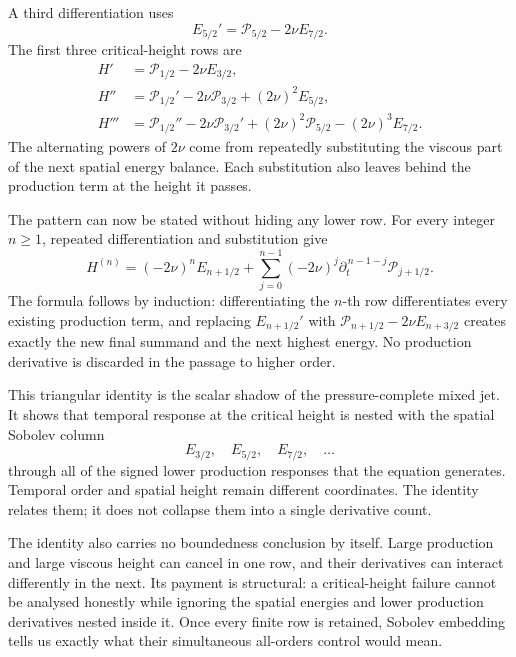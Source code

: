 A third differentiation uses
\[
  E_{5/2}'
  =
  \mathcal P_{5/2}-2\nu E_{7/2}.
\]
The first three critical-height rows are
\begin{align*}
  H'
  &={}
  \mathcal P_{1/2}-2\nu E_{3/2},
  \\
  H''
  &={}
  \mathcal P_{1/2}'
  -2\nu\mathcal P_{3/2}
  +(2\nu)^2E_{5/2},
  \\
  H'''
  &={}
  \mathcal P_{1/2}''
  -2\nu\mathcal P_{3/2}'
  +(2\nu)^2\mathcal P_{5/2}
  -(2\nu)^3E_{7/2}.
\end{align*}
The alternating powers of \(2\nu\) come from repeatedly substituting the viscous part of the next spatial energy balance.
Each substitution also leaves behind the production term at the height it passes.

The pattern can now be stated without hiding any lower row.
For every integer \(n\geq1\), repeated differentiation and substitution give
\[
  H^{(n)}
  =
  (-2\nu)^nE_{n+1/2}
  +
  \sum_{j=0}^{n-1}
  (-2\nu)^j
  \partial_t^{\,n-1-j}\mathcal P_{j+1/2}.
\]
The formula follows by induction: differentiating the \(n\)-th row differentiates every existing production term, and replacing \(E_{n+1/2}'\) with \(\mathcal P_{n+1/2}-2\nu E_{n+3/2}\) creates exactly the new final summand and the next highest energy.
No production derivative is discarded in the passage to higher order.

This triangular identity is the scalar shadow of the pressure-complete mixed jet.
It shows that temporal response at the critical height is nested with the spatial Sobolev column
\[
  E_{3/2},
  \quad
  E_{5/2},
  \quad
  E_{7/2},
  \quad\ldots
\]
through all of the signed lower production responses that the equation generates.
Temporal order and spatial height remain different coordinates.
The identity relates them; it does not collapse them into a single derivative count.

The identity also carries no boundedness conclusion by itself.
Large production and large viscous height can cancel in one row, and their derivatives can interact differently in the next.
Its payment is structural: a critical-height failure cannot be analysed honestly while ignoring the spatial energies and lower production derivatives nested inside it.
Once every finite row is retained, Sobolev embedding tells us exactly what their simultaneous all-orders control would mean.
